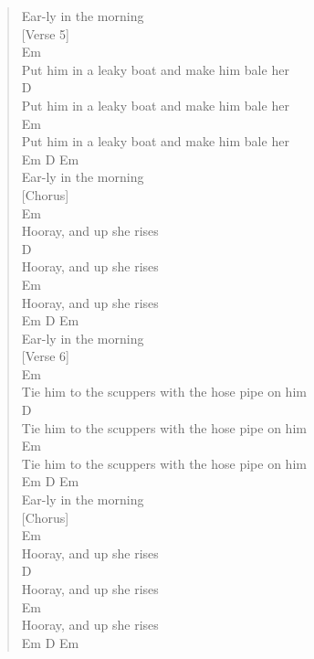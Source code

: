 \documentclass[11pt]{article}
\begin{document}
\begin{verse}
Ear-ly in the morning\\
\vspace*{1em}
\vspace*{1em}
[Verse 5]\\
Em\\
Put him in a leaky boat and make him bale her\\
D\\
Put him in a leaky boat and make him bale her\\
Em\\
Put him in a leaky boat and make him bale her\\
Em  D         Em\\
Ear-ly in the morning\\
\vspace*{1em}
\vspace*{1em}
[Chorus]\\
Em\\
Hooray, and up she rises\\
D\\
Hooray, and up she rises\\
Em\\
Hooray, and up she rises\\
Em  D         Em\\
Ear-ly in the morning\\
\vspace*{1em}
\vspace*{1em}
[Verse 6]\\
Em\\
Tie him to the scuppers with the hose pipe on him\\
D\\
Tie him to the scuppers with the hose pipe on him\\
Em\\
Tie him to the scuppers with the hose pipe on him\\
Em  D         Em\\
Ear-ly in the morning\\
\vspace*{1em}
\vspace*{1em}
[Chorus]\\
Em\\
Hooray, and up she rises\\
D\\
Hooray, and up she rises\\
Em\\
Hooray, and up she rises\\
Em  D         Em\\

\end{verse}
\end{document}
